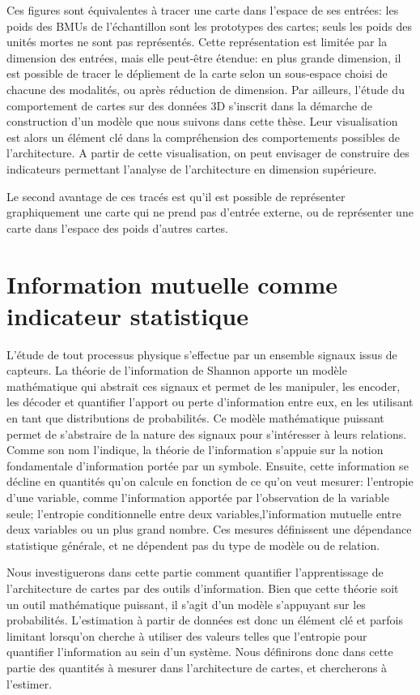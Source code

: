 {Ces figures sont équivalentes à tracer une carte dans l'espace de ses entrées: les poids des BMUs de l'échantillon sont les prototypes des cartes; seuls les poids des unités mortes ne sont pas représentés.
Cette représentation est limitée par la dimension des entrées, mais elle peut-être étendue: en plus grande dimension, il est possible de tracer le dépliement de la carte selon un sous-espace choisi de chacune des modalités, ou après réduction de dimension.
Par ailleurs, l'étude du comportement de cartes sur des données 3D s'inscrit dans la démarche de construction d'un modèle que nous suivons dans cette thèse. Leur visualisation est alors un élément clé dans la compréhension des comportements possibles de l'architecture. A partir de cette visualisation, on peut envisager de construire des indicateurs permettant l'analyse de l'architecture en dimension supérieure. 

Le second avantage de ces tracés est qu'il est possible de représenter graphiquement une carte qui ne prend pas d'entrée externe, ou de représenter une carte dans l'espace des poids d'autres cartes.
}

\section{Information mutuelle comme indicateur statistique}

L'étude de tout processus physique s'effectue par un ensemble signaux issus de capteurs. La théorie de l'information de Shannon \cite{Shannon1948AMT} apporte un modèle mathématique qui abstrait ces signaux et permet de les manipuler, les encoder, les décoder et quantifier l'apport ou perte d'information entre eux, en les utilisant en tant que distributions de probabilités.
Ce modèle mathématique puissant permet de s'abstraire de la nature des signaux pour s'intéresser à leurs relations. Comme son nom l'indique, la théorie de l'information s'appuie sur la notion fondamentale d'information portée par un symbole. Ensuite, cette information se décline en quantités qu'on calcule en fonction de ce qu'on veut mesurer: l'entropie d'une variable, comme l'information apportée par l'observation de la variable seule; l'entropie conditionnelle entre deux variables,l'information mutuelle entre deux variables ou un plus grand nombre. Ces mesures définissent une dépendance statistique générale, et ne dépendent pas du type de modèle ou de relation.

Nous investiguerons dans cette partie comment quantifier l'apprentissage de l'architecture de cartes par des outils d'information. Bien que cette théorie soit un outil mathématique puissant, il s'agit d'un modèle s'appuyant sur les probabilités. L'estimation à partir de données est donc un élément clé et parfois limitant lorsqu'on cherche à utiliser des valeurs telles que l'entropie pour quantifier l'information au sein d'un système. Nous définirons donc dans cette partie des quantités à mesurer dans l'architecture de cartes, et chercherons à l'estimer.


